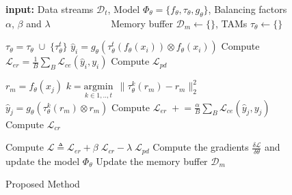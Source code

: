 \documentclass{article} %
\newcommand{\pluseq}{\mathrel{+}=}
\begin{document}
\begin{figure}[!t]
\begin{algorithm}[H]
\caption{Proposed Method}
\label{alg:method}
\begin{algorithmic}[1]
    \Statex \textbf{input:} Data streams $\mathcal{D}_{t}$, Model $\Phi_\theta = \{ f_\theta, \tau_{\theta}, g_\theta\}$, Balancing factors $\alpha$, $\beta$ and $\lambda$
    \Statex ~~~~~~~~~~~~Memory buffer $\mathcal{D}_m \leftarrow \{\}$, TAMs $\tau_{\theta} \leftarrow \{\}$
    
        \State $\tau_{\theta} = \tau_{\theta} \; \cup \; \{ \tau^{t}_{\theta}\}$
        \State $\hat{y}_{i} = g_\theta( \tau^{t}_{\theta}(f_\theta(x_i)) \otimes f_\theta(x_i))$
        \State Compute $\mathcal{L}_{er} = \frac{1}{B}  \sum_{B} \mathcal{L}_{ce} (\hat{y}_{i},  y_{i})$ 
        \State Compute $\mathcal{L}_{pd}$ 

        
                    \State $r_{m} = f_\theta(x_{j})$
                    \State $k = \underset{k \in {1,..,t}}{\mathrm{argmin}}\:\:  \lVert \tau^{k}_{\theta}(r_m) - r_m \rVert^2_{2}$ 
                    \State $\hat{y}_{j} = g_\theta( \tau^{k}_{\theta}(r_{m}) \otimes r_{m})$
                    \State Compute $\mathcal{L}_{er} \; \pluseq \frac{\alpha}{B} \displaystyle \sum_{B}^{} \mathcal{L}_{ce} (\hat{y}_{j},  y_{j})$  
                    \State Compute $\mathcal{L}_{cr}$ 
                \EndFor
                
            \EndIf
            \State Compute $\mathcal{L} \triangleq \mathcal{L}_{er} + \beta \;\mathcal{L}_{cr} - \lambda \;\mathcal{L}_{pd}$ 
            \State Compute the gradients $\displaystyle \frac{\delta \mathcal{L}}{\delta \theta}$ and update the model $\Phi_{\theta}$
            \State Update the memory buffer $\mathcal{D}_m$
        \EndFor
    \EndFor
    \State {}
    \end{algorithmic}
    \end{algorithm}
\end{figure}
\end{document}
